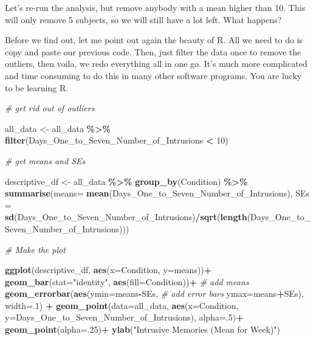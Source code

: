 \documentclass[
]{book}
\newenvironment{Shaded}{\begin{snugshade}}{\end{snugshade}}
\newcommand{\AttributeTok}[1]{\textcolor[rgb]{0.13,0.29,0.53}{#1}}
\newcommand{\CommentTok}[1]{\textcolor[rgb]{0.56,0.35,0.01}{\textit{#1}}}
\newcommand{\DecValTok}[1]{\textcolor[rgb]{0.00,0.00,0.81}{#1}}
\newcommand{\FunctionTok}[1]{\textcolor[rgb]{0.13,0.29,0.53}{\textbf{#1}}}
\newcommand{\NormalTok}[1]{#1}
\newcommand{\OtherTok}[1]{\textcolor[rgb]{0.56,0.35,0.01}{#1}}
\newcommand{\SpecialCharTok}[1]{\textcolor[rgb]{0.81,0.36,0.00}{\textbf{#1}}}
\newcommand{\StringTok}[1]{\textcolor[rgb]{0.31,0.60,0.02}{#1}}
\begin{document}
Let's re-run the analysis, but remove anybody with a mean higher than 10. This will only remove 5 subjects, so we will still have a lot left. What happens?

Before we find out, let me point out again the beauty of R. All we need to do is copy and paste our previous code. Then, just filter the data once to remove the outliers, then voila, we redo everything all in one go. It's much more complicated and time consuming to do this in many other software programs. You are lucky to be learning R.

\begin{Shaded}
\begin{Highlighting}[]
\CommentTok{\# get rid out of outliers}

\NormalTok{all\_data  }\OtherTok{\textless{}{-}}\NormalTok{ all\_data }\SpecialCharTok{\%\textgreater{}\%}
             \FunctionTok{filter}\NormalTok{(Days\_One\_to\_Seven\_Number\_of\_Intrusions }\SpecialCharTok{\textless{}} \DecValTok{10}\NormalTok{)}

\CommentTok{\# get means and SEs}

\NormalTok{descriptive\_df }\OtherTok{\textless{}{-}}\NormalTok{ all\_data }\SpecialCharTok{\%\textgreater{}\%} 
                    \FunctionTok{group\_by}\NormalTok{(Condition) }\SpecialCharTok{\%\textgreater{}\%} 
                    \FunctionTok{summarise}\NormalTok{(}\AttributeTok{means=} \FunctionTok{mean}\NormalTok{(Days\_One\_to\_Seven\_Number\_of\_Intrusions),}
                              \AttributeTok{SEs =} \FunctionTok{sd}\NormalTok{(Days\_One\_to\_Seven\_Number\_of\_Intrusions)}\SpecialCharTok{/}\FunctionTok{sqrt}\NormalTok{(}\FunctionTok{length}\NormalTok{(Days\_One\_to\_Seven\_Number\_of\_Intrusions)))}

\CommentTok{\# Make the plot}

\FunctionTok{ggplot}\NormalTok{(descriptive\_df, }\FunctionTok{aes}\NormalTok{(}\AttributeTok{x=}\NormalTok{Condition, }\AttributeTok{y=}\NormalTok{means))}\SpecialCharTok{+} 
  \FunctionTok{geom\_bar}\NormalTok{(}\AttributeTok{stat=}\StringTok{"identity"}\NormalTok{, }\FunctionTok{aes}\NormalTok{(}\AttributeTok{fill=}\NormalTok{Condition))}\SpecialCharTok{+} \CommentTok{\# add means}
  \FunctionTok{geom\_errorbar}\NormalTok{(}\FunctionTok{aes}\NormalTok{(}\AttributeTok{ymin=}\NormalTok{means}\SpecialCharTok{{-}}\NormalTok{SEs,               }\CommentTok{\# add error bars}
                    \AttributeTok{ymax=}\NormalTok{means}\SpecialCharTok{+}\NormalTok{SEs), }\AttributeTok{width=}\NormalTok{.}\DecValTok{1}\NormalTok{) }\SpecialCharTok{+}
  \FunctionTok{geom\_point}\NormalTok{(}\AttributeTok{data=}\NormalTok{all\_data, }\FunctionTok{aes}\NormalTok{(}\AttributeTok{x=}\NormalTok{Condition, }\AttributeTok{y=}\NormalTok{Days\_One\_to\_Seven\_Number\_of\_Intrusions), }\AttributeTok{alpha=}\NormalTok{.}\DecValTok{5}\NormalTok{)}\SpecialCharTok{+}
  \FunctionTok{geom\_point}\NormalTok{(}\AttributeTok{alpha=}\NormalTok{.}\DecValTok{25}\NormalTok{)}\SpecialCharTok{+}
  \FunctionTok{ylab}\NormalTok{(}\StringTok{"Intrusive Memories (Mean for Week)"}\NormalTok{)}
\end{Highlighting}
\end{Shaded}
\end{document}
